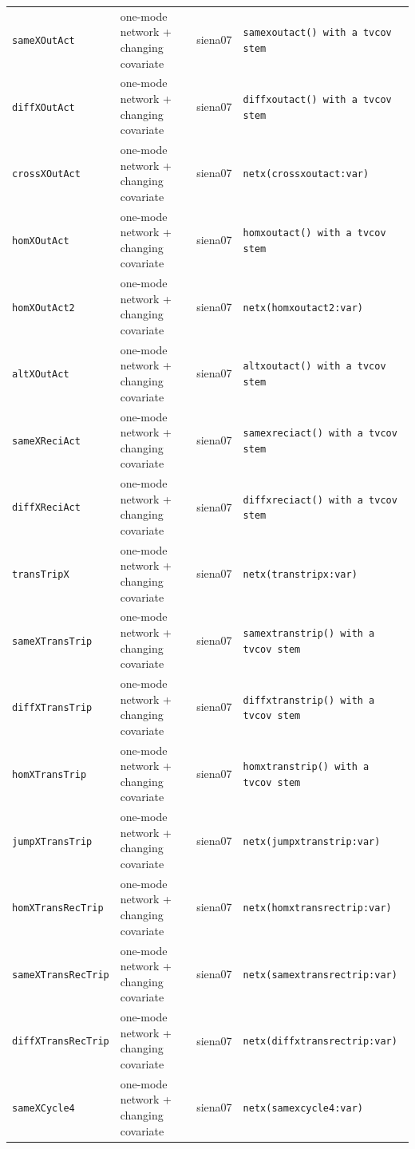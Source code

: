 \begin{longtable}{@{}p{2.6cm}p{3.2cm}p{2.9cm}p{5.4cm}@{}}
\texttt{sameXOutAct} & one-mode network + changing covariate & siena07 & \texttt{samexoutact() with a tvcov stem}\\
\texttt{diffXOutAct} & one-mode network + changing covariate & siena07 & \texttt{diffxoutact() with a tvcov stem}\\
\texttt{crossXOutAct} & one-mode network + changing covariate & siena07 & \texttt{netx(crossxoutact:var)}\\
\texttt{homXOutAct} & one-mode network + changing covariate & siena07 & \texttt{homxoutact() with a tvcov stem}\\
\texttt{homXOutAct2} & one-mode network + changing covariate & siena07 & \texttt{netx(homxoutact2:var)}\\
\texttt{altXOutAct} & one-mode network + changing covariate & siena07 & \texttt{altxoutact() with a tvcov stem}\\
\texttt{sameXReciAct} & one-mode network + changing covariate & siena07 & \texttt{samexreciact() with a tvcov stem}\\
\texttt{diffXReciAct} & one-mode network + changing covariate & siena07 & \texttt{diffxreciact() with a tvcov stem}\\
\texttt{transTripX} & one-mode network + changing covariate & siena07 & \texttt{netx(transtripx:var)}\\
\texttt{sameXTransTrip} & one-mode network + changing covariate & siena07 & \texttt{samextranstrip() with a tvcov stem}\\
\texttt{diffXTransTrip} & one-mode network + changing covariate & siena07 & \texttt{diffxtranstrip() with a tvcov stem}\\
\texttt{homXTransTrip} & one-mode network + changing covariate & siena07 & \texttt{homxtranstrip() with a tvcov stem}\\
\texttt{jumpXTransTrip} & one-mode network + changing covariate & siena07 & \texttt{netx(jumpxtranstrip:var)}\\
\texttt{homXTransRecTrip} & one-mode network + changing covariate & siena07 & \texttt{netx(homxtransrectrip:var)}\\
\texttt{sameXTransRecTrip} & one-mode network + changing covariate & siena07 & \texttt{netx(samextransrectrip:var)}\\
\texttt{diffXTransRecTrip} & one-mode network + changing covariate & siena07 & \texttt{netx(diffxtransrectrip:var)}\\
\texttt{sameXCycle4} & one-mode network + changing covariate & siena07 & \texttt{netx(samexcycle4:var)}\\

\end{longtable}
